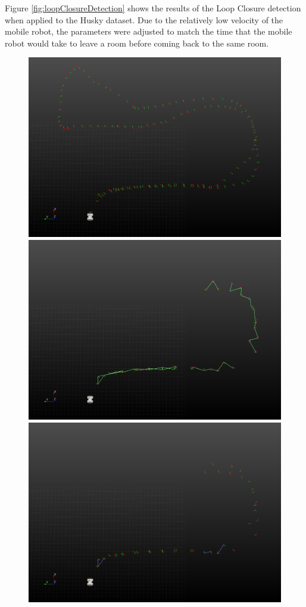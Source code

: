 \documentclass[12pt]{article}
\begin{document}
Figure \ref{fig:loopClosureDetection} shows the results of the Loop Closure detection when applied to the Husky dataset. Due to the relatively low velocity of the mobile robot, the parameters were adjusted to match the time that the mobile robot would take to leave a room before coming back to the same room.

\begin{figure}
\begin{minipage}{0.67\textwidth}
\centering
\includegraphics[width=\textwidth]{LoopClosureTimeSampling}
\includegraphics[width=\textwidth]{LoopClosureEuclideanSampling}
\includegraphics[width=\textwidth]{LoopClosureFinal}

\end{minipage}
\end{figure}
\end{document}
